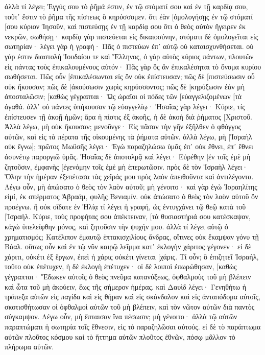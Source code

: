 ἀλλὰ τί λέγει; Ἐγγύς σου τὸ ῥῆμά ἐστιν, ἐν τῷ στόματί σου καὶ ἐν τῇ καρδίᾳ σου, τοῦτ᾽ ἔστιν τὸ ῥῆμα τῆς πίστεως ὃ κηρύσσομεν. 
ὅτι ἐὰν [ὁμολογήσῃς ἐν τῷ στόματί [σου κύριον Ἰησοῦν, καὶ πιστεύσῃς ἐν τῇ καρδίᾳ σου ὅτι ὁ θεὸς αὐτὸν ἤγειρεν ἐκ νεκρῶν, σωθήσῃ· 
καρδίᾳ γὰρ πιστεύεται εἰς δικαιοσύνην, στόματι δὲ ὁμολογεῖται εἰς σωτηρίαν· 
λέγει γὰρ ἡ γραφή· Πᾶς ὁ πιστεύων ἐπ᾽ αὐτῷ οὐ καταισχυνθήσεται. 
οὐ γάρ ἐστιν διαστολὴ Ἰουδαίου τε καὶ Ἕλληνος, ὁ γὰρ αὐτὸς κύριος πάντων, πλουτῶν εἰς πάντας τοὺς ἐπικαλουμένους αὐτόν· 
Πᾶς γὰρ ὃς ἂν ἐπικαλέσηται τὸ ὄνομα κυρίου σωθήσεται. 
Πῶς οὖν [ἐπικαλέσωνται εἰς ὃν οὐκ ἐπίστευσαν; πῶς δὲ [πιστεύσωσιν οὗ οὐκ ἤκουσαν; πῶς δὲ [ἀκούσωσιν χωρὶς κηρύσσοντος; 
πῶς δὲ [κηρύξωσιν ἐὰν μὴ ἀποσταλῶσιν; [καθὼς γέγραπται· Ὡς ὡραῖοι οἱ πόδες τῶν [εὐαγγελιζομένων [τὰ ἀγαθά. 
ἀλλ᾽ οὐ πάντες ὑπήκουσαν τῷ εὐαγγελίῳ· Ἠσαΐας γὰρ λέγει· Κύριε, τίς ἐπίστευσεν τῇ ἀκοῇ ἡμῶν; 
ἄρα ἡ πίστις ἐξ ἀκοῆς, ἡ δὲ ἀκοὴ διὰ ῥήματος [Χριστοῦ. 
Ἀλλὰ λέγω, μὴ οὐκ ἤκουσαν; μενοῦνγε· Εἰς πᾶσαν τὴν γῆν ἐξῆλθεν ὁ φθόγγος αὐτῶν, καὶ εἰς τὰ πέρατα τῆς οἰκουμένης τὰ ῥήματα αὐτῶν. 
ἀλλὰ λέγω, μὴ [Ἰσραὴλ οὐκ ἔγνω]; πρῶτος Μωϋσῆς λέγει· Ἐγὼ παραζηλώσω ὑμᾶς ἐπ᾽ οὐκ ἔθνει, ἐπ᾽ ἔθνει ἀσυνέτῳ παροργιῶ ὑμᾶς. 
Ἠσαΐας δὲ ἀποτολμᾷ καὶ λέγει· Εὑρέθην [ἐν τοῖς ἐμὲ μὴ ζητοῦσιν, ἐμφανὴς [ἐγενόμην τοῖς ἐμὲ μὴ ἐπερωτῶσιν. 
πρὸς δὲ τὸν Ἰσραὴλ λέγει· Ὅλην τὴν ἡμέραν ἐξεπέτασα τὰς χεῖράς μου πρὸς λαὸν ἀπειθοῦντα καὶ ἀντιλέγοντα. 
Λέγω οὖν, μὴ ἀπώσατο ὁ θεὸς τὸν λαὸν αὐτοῦ; μὴ γένοιτο· καὶ γὰρ ἐγὼ Ἰσραηλίτης εἰμί, ἐκ σπέρματος Ἀβραάμ, φυλῆς Βενιαμίν. 
οὐκ ἀπώσατο ὁ θεὸς τὸν λαὸν αὐτοῦ ὃν προέγνω. ἢ οὐκ οἴδατε ἐν Ἠλίᾳ τί λέγει ἡ γραφή, ὡς ἐντυγχάνει τῷ θεῷ κατὰ τοῦ [Ἰσραήλ. 
Κύριε, τοὺς προφήτας σου ἀπέκτειναν, [τὰ θυσιαστήριά σου κατέσκαψαν, κἀγὼ ὑπελείφθην μόνος, καὶ ζητοῦσιν τὴν ψυχήν μου. 
ἀλλὰ τί λέγει αὐτῷ ὁ χρηματισμός; Κατέλιπον ἐμαυτῷ ἑπτακισχιλίους ἄνδρας, οἵτινες οὐκ ἔκαμψαν γόνυ τῇ Βάαλ. 
οὕτως οὖν καὶ ἐν τῷ νῦν καιρῷ λεῖμμα κατ᾽ ἐκλογὴν χάριτος γέγονεν· 
εἰ δὲ χάριτι, οὐκέτι ἐξ ἔργων, ἐπεὶ ἡ χάρις οὐκέτι γίνεται [χάρις. 
Τί οὖν; ὃ ἐπιζητεῖ Ἰσραήλ, τοῦτο οὐκ ἐπέτυχεν, ἡ δὲ ἐκλογὴ ἐπέτυχεν· οἱ δὲ λοιποὶ ἐπωρώθησαν, 
[καθὼς γέγραπται· Ἔδωκεν αὐτοῖς ὁ θεὸς πνεῦμα κατανύξεως, ὀφθαλμοὺς τοῦ μὴ βλέπειν καὶ ὦτα τοῦ μὴ ἀκούειν, ἕως τῆς σήμερον ἡμέρας. 
καὶ Δαυὶδ λέγει· Γενηθήτω ἡ τράπεζα αὐτῶν εἰς παγίδα καὶ εἰς θήραν καὶ εἰς σκάνδαλον καὶ εἰς ἀνταπόδομα αὐτοῖς, 
σκοτισθήτωσαν οἱ ὀφθαλμοὶ αὐτῶν τοῦ μὴ βλέπειν, καὶ τὸν νῶτον αὐτῶν διὰ παντὸς σύγκαμψον. 
Λέγω οὖν, μὴ ἔπταισαν ἵνα πέσωσιν; μὴ γένοιτο· ἀλλὰ τῷ αὐτῶν παραπτώματι ἡ σωτηρία τοῖς ἔθνεσιν, εἰς τὸ παραζηλῶσαι αὐτούς. 
εἰ δὲ τὸ παράπτωμα αὐτῶν πλοῦτος κόσμου καὶ τὸ ἥττημα αὐτῶν πλοῦτος ἐθνῶν, πόσῳ μᾶλλον τὸ πλήρωμα αὐτῶν. 
